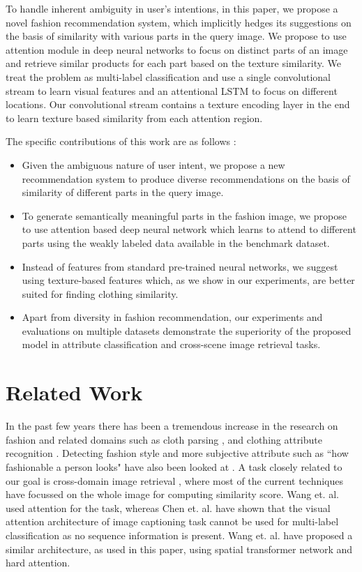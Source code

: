 \documentclass{article}
\begin{document}
To handle inherent ambiguity in user's intentions, in this paper, we propose a novel fashion recommendation system, which implicitly hedges its suggestions on the basis of similarity with various parts in the query image. We propose to use attention module in deep neural networks to focus on distinct parts of an image and retrieve similar products for each part based on the texture similarity. We treat the problem as multi-label classification and use a single convolutional stream to learn visual features and an attentional LSTM to focus on different locations. Our convolutional stream contains a texture encoding layer in the end to learn texture based similarity from each attention region.

The specific contributions of this work are as follows :
\begin{itemize}
\item Given the ambiguous nature of user intent, we propose a new recommendation system to produce diverse recommendations on the basis of similarity of different parts in the query image.
\item To generate semantically meaningful parts in the fashion image, we propose to use attention based deep neural network which learns to attend to different parts using the weakly labeled data available in the benchmark dataset.
\item Instead of features from standard pre-trained neural networks, we suggest using texture-based features which, as we show in our experiments, are better suited for finding clothing similarity.
\item Apart from diversity in fashion recommendation, our experiments and evaluations on multiple datasets demonstrate the superiority of the proposed model in attribute classification and cross-scene image retrieval tasks.
\end{itemize}

\section{Related Work}

In the past few years there has been a tremendous increase in the research on fashion and related domains \cite{SimoSerraACCV2014, YamaguchiCVPR2012} such as cloth parsing \cite{YamaguchiPAMI2015, yang2014clothing}, and clothing attribute recognition \cite{chen2012describing, YamaguchiBMVC2015}. Detecting fashion style \cite{VeitICCV2015} and more subjective attribute such as ``how fashionable a person looks" have also been looked at \cite{SimoSerraCVPR2015}. A task closely related to our goal is cross-domain image retrieval \cite{LiuCVPR2012, HuangICCV2015}, where most of the current techniques have focussed on the whole image for computing similarity score. Wang et. al. \cite{WangVCIP2017} used attention for the task, whereas Chen et. al. \cite{ChenAAAI2018} have shown that the visual attention architecture of image captioning task cannot be used for multi-label classification as no sequence information is present. Wang et. al. \cite{WangSTLSTMICCV2017} have proposed a similar architecture, as used in this paper, using spatial transformer network and hard attention.
\end{document}
